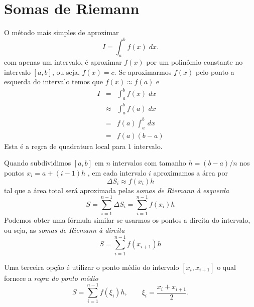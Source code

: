 \section{Somas de Riemann}
O método mais simples de aproximar
\begin{equation}
 I = \int_a^b f(x) \;dx.
\end{equation}
com apenas um intervalo, é aproximar $f(x)$ por um polinômio constante no intervalo $[a,b]$, ou seja, $f(x)=c$. Se aproximarmos $f(x)$ pelo ponto a esquerda do intervalo temos que $f(x)\approx f(a)$ e
\begin{eqnarray}
 I &=& \int_a^b f(x) \;dx\\
   &\approx& \int_a^b f(a) \;dx \\
   &=& f(a) \int_a^b\,dx\\
   &=& f(a) (b-a)
\end{eqnarray}
Esta é a regra de quadratura local para $1$ intervalo.

Quando subdividimos $[a,b]$ em $n$ intervalos com tamanho $h=(b-a)/n$ nos pontos $x_i=a+(i-1)h$ , em cada intervalo $i$ aproximamos a área por
\begin{equation}
  \Delta S_i \approx f(x_i)h
\end{equation}
tal que a área total será aproximada pelas \emph{somas de Riemann à esquerda}
\begin{equation}
S =\sum_{i=1}^{n-1} \Delta S_i = \sum_{i=1}^{n-1} f(x_i) h
\end{equation}
Podemos obter uma fórmula similar se usarmos os pontos a direita do intervalo, ou seja, as \emph{somas de Riemann à direita}
\begin{equation}
S = \sum_{i=1}^{n-1} f(x_{i+1}) h
\end{equation}

Uma terceira opção é utilizar o ponto médio do intervalo $[x_i,x_{i+1}]$ o qual fornece a \emph{regra do ponto médio}
\begin{equation}\label{eq:regra_do_ponto_medio}
S = \sum_{i=1}^{n-1} f(\xi_i ) h, \qquad \xi_i=\frac{x_i+x_{i+1}}{2}.
\end{equation}


